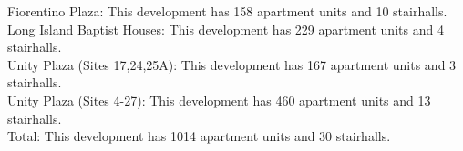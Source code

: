 {Fiorentino Plaza}: This development has 158 apartment units and 10 stairhalls.\\{Long Island Baptist Houses}: This development has 229 apartment units and 4 stairhalls.\\{Unity Plaza (Sites 17,24,25A)}: This development has 167 apartment units and 3 stairhalls.\\{Unity Plaza (Sites 4-27)}: This development has 460 apartment units and 13 stairhalls.\\{Total}: This development has 1014 apartment units and 30 stairhalls.\\